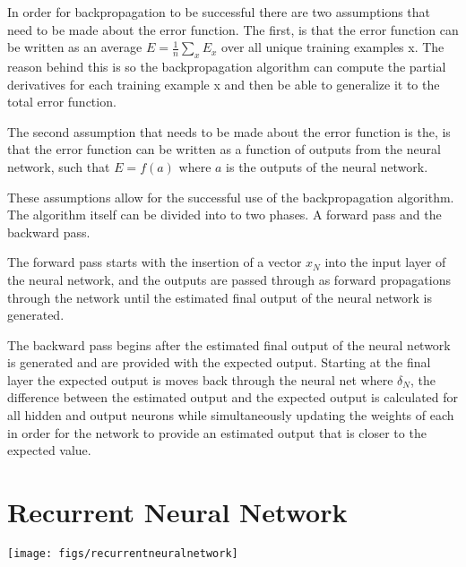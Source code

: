 \documentclass[twocolumn]{webofc}
\begin{document}
In order for backpropagation to be successful there are two assumptions that need to be made about the error function. The first, is that the error function can be written as an average $ E = \frac{1}{n}\sum_{x} E_x$ over all unique training examples x. The reason behind this is so the backpropagation algorithm can compute the partial derivatives for each training example x and then be able to generalize it to the total error function.

The second assumption that needs to be made about the error function is the, is that the error function can be written as a function of outputs from the neural network, such that $E = f(a)$ where $a$ is the outputs of the neural network. 

These assumptions allow for the successful use of the backpropagation algorithm. The algorithm itself can be divided into to two phases. A forward pass and the backward pass. 

The forward pass starts with the insertion of a vector $x_N$ into the input layer of the neural network, and the outputs are passed through as forward propagations through the network until the estimated final output of the neural network is generated. 

The backward pass begins after the estimated final output of the neural network is generated and are provided with the expected output. Starting at the final layer the expected output is moves back through the neural net where  $\delta_N$, the difference between the estimated output and the expected output is calculated for all hidden and output neurons while simultaneously updating the weights of each in order for the network to provide an estimated output that is closer to the expected value.   


\vspace{1.5\baselineskip}
\section{Recurrent Neural Network}\label{models}

\texttt{[image: figs/recurrentneuralnetwork]}
\end{document}
